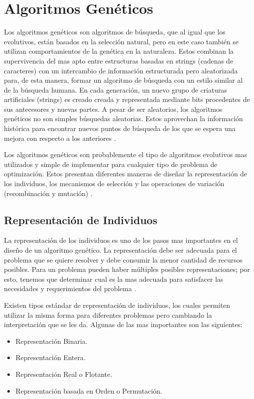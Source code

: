 \section{Algoritmos Genéticos}
\label{sec:algoritmos_geneticos}
Los algoritmos genéticos son algoritmos de búsqueda, que al igual que los evolutivos, están basados en la selección natural, pero en este caso también se utilizan comportamientos de la genética en la naturaleza. Estos combinan la supervivencia del mas apto entre estructuras basadas en strings (cadenas de caracteres) con un intercambio de información estructurada pero aleatorizada para, de esta manera, formar un algoritmo de búsqueda con un estilo similar al de la búsqueda humana. En cada generación, un nuevo grupo de criaturas artificiales (strings) es creado creada y representada mediante bits procedentes de sus antecesores y nuevas partes. A pesar de ser aleatorios, los algoritmos genéticos no son simples búsquedas aleatorias. Estos aprovechan la información histórica para encontrar nuevos puntos de búsqueda de los que se espera una mejora con respecto a los anteriores \cite{goldberg1989genetic}.

Los algoritmos genéticos son probablemente el tipo de algoritmos evolutivos mas utilizados y simple de implementar para cualquier tipo de problema de optimización. Estos presentan diferentes maneras de diseñar la representación de los individuos, los mecanismos de selección y las operaciones de variación (recombinación y mutación) \cite{grosan2011intelligent}.

\subsection{Representación de Individuos}
La representación de los individuos es uno de los pasos mas importantes en el diseño de un algoritmo genético. La representación debe ser adecuada para el problema que se quiere resolver y debe consumir la menor cantidad de recursos posibles. Para un problema pueden haber múltiples posibles representaciones; por esto, tenemos que determinar cual es la mas adecuada para satisfacer las necesidades y requerimientos del problema \cite{grosan2011intelligent}.

Existen tipos estándar de representación de individuos, los cuales permiten utilizar la misma forma para diferentes problemas pero cambiando la interpretación que se les da. Algunas de las mas importantes son las siguientes:
\begin{itemize}
    \item Representación Binaria.
    \item Representación Entera.
    \item Representación Real o Flotante.
    \item Representación basada en Orden o Permutación.
\end{itemize}

